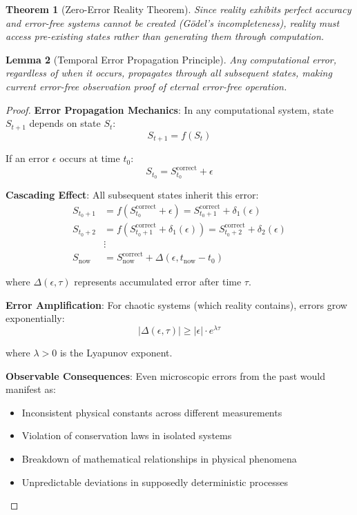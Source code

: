 \documentclass[12pt,a4paper]{article}
\newtheorem{theorem}{Theorem}[section]
\newtheorem{lemma}[theorem]{Lemma}
\begin{document}
\begin{theorem}[Zero-Error Reality Theorem]
Since reality exhibits perfect accuracy and error-free systems cannot be created (Gödel's incompleteness), reality must access pre-existing states rather than generating them through computation.
\end{theorem}

\begin{lemma}[Temporal Error Propagation Principle]
Any computational error, regardless of when it occurs, propagates through all subsequent states, making current error-free observation proof of eternal error-free operation.
\end{lemma}

\begin{proof}
\textbf{Error Propagation Mechanics}: In any computational system, state $S_{t+1}$ depends on state $S_t$:
$$S_{t+1} = f(S_t)$$

If an error $\epsilon$ occurs at time $t_0$:
$$S_{t_0} = S_{t_0}^{\text{correct}} + \epsilon$$

\textbf{Cascading Effect}: All subsequent states inherit this error:
\begin{align}
S_{t_0+1} &= f(S_{t_0}^{\text{correct}} + \epsilon) = S_{t_0+1}^{\text{correct}} + \delta_1(\epsilon) \\
S_{t_0+2} &= f(S_{t_0+1}^{\text{correct}} + \delta_1(\epsilon)) = S_{t_0+2}^{\text{correct}} + \delta_2(\epsilon) \\
&\vdots \\
S_{\text{now}} &= S_{\text{now}}^{\text{correct}} + \Delta(\epsilon, t_{\text{now}} - t_0)
\end{align}

where $\Delta(\epsilon, \tau)$ represents accumulated error after time $\tau$.

\textbf{Error Amplification}: For chaotic systems (which reality contains), errors grow exponentially:
$$|\Delta(\epsilon, \tau)| \geq |\epsilon| \cdot e^{\lambda \tau}$$

where $\lambda > 0$ is the Lyapunov exponent.

\textbf{Observable Consequences}: Even microscopic errors from the past would manifest as:
\begin{itemize}
    \item Inconsistent physical constants across different measurements
    \item Violation of conservation laws in isolated systems  
    \item Breakdown of mathematical relationships in physical phenomena
    \item Unpredictable deviations in supposedly deterministic processes
\end{itemize}


\end{proof}
\end{document}
